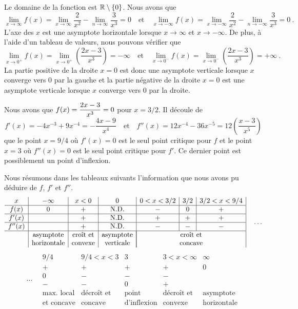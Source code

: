 { Le domaine de la fonction est $\mathbb{R}\setminus \{0\}$.
Nous avons que
\[
\lim_{x\rightarrow \infty} f(x)
= \lim_{x\rightarrow \infty} \frac{2}{x^2} - \lim_{n\to \infty} \frac{3}{x^3}
= 0
\quad \text{et} \quad
\lim_{x\rightarrow -\infty} f(x) =
\lim_{x\rightarrow -\infty} \frac{2}{x^2} - \lim_{n\to -\infty} \frac{3}{x^3} = 0
\ .
\]
L'axe des $x$ est une asymptote horizontale lorsque $x\to \infty$ et
$x\to -\infty$.  De plus, à l'aide d'un tableau de valeurs, nous pouvons
vérifier que
\[
\lim_{x\rightarrow 0^+} f(x) = 
\lim_{x\rightarrow 0^+} \left( \frac{2x-3}{x^3} \right) = -\infty
\quad \text{et} \quad
\lim_{x\rightarrow 0^-} f(x) = 
\lim_{x\rightarrow 0^-} \left( \frac{2x-3}{x^3} \right) = +\infty \ .
\]
La partie positive de la droite $x=0$ est donc une asymptote verticale
lorsque $x$ converge vers $0$ par la gauche et la partie négative de la
droite $x=0$ est une asymptote verticale lorsque $x$ converge vers $0$
par la droite.

Nous avons que $\displaystyle f(x)= \frac{2x-3}{x^3} = 0$ pour $x = 3/2$.
Il découle de
\[
f'(x) = -4x^{-3} + 9 x^{-4} = -\frac{4x-9}{x^4}
\quad \text{et} \quad
f''(x) = 12x^{-4} - 36 x^{-5} = 12 \left(\frac{x-3}{x^5}\right)
\]
que le point $x=9/4$ où $f'(x)=0$ est le seul point critique pour $f$
et le point $x=3$ où $f''(x)=0$ est le seul point critique pour $f'$.
Ce dernier point est possiblement un point d'inflexion.

Nous résumons dans les tableaux suivants l'information que nous avons pu
déduire de $f$, $f'$ et $f''$.
\[
\begin{array}{c|c|c|c|c|c|c|}
x & -\infty & x<0 & 0 & 0<x<3/2 & 3/2 & 3/2<x<9/4 \\
\hline
f(x) & 0 & + & \text{N.D.} & - & 0 & + \\
\hline
f'(x) & & + & \text{N.D.} & + & + & + \\
\hline
f''(x) & & + & \text{N.D.} & - & - & - \\
\hline
& \text{asymptote} & \text{croît et} & \text{asymptote} &
\multicolumn{3}{|c|}{\text{croît et}} \\
& \text{horizontale} & \text{convexe} & \text{verticale} &
\multicolumn{3}{|c|}{\text{concave}}
\end{array} \quad \ldots
\]
\[
\ldots \quad 
\begin{array}{|c|c|c|c|c}
9/4 & 9/4<x<3 & 3 & 3<x<\infty & \infty \\
\hline
+ & + & + & + & 0 \\
\hline
0 & - & - & - & \\
\hline
- & - & 0 & + & \\
\hline
\text{max. local} & \text{décroît et} & \text{point} &
\text{décroît et} & \text{asymptote} \\
\text{et concave} & \text{concave} & \text{d'inflexion} &
\text{convexe} & \text{horizontale}
\end{array}
\]

}

